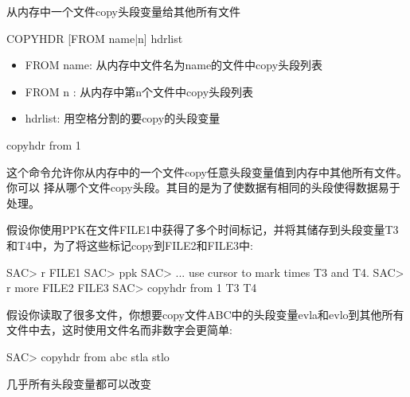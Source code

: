 \label{cmd:copyhdr}

从内存中一个文件copy头段变量给其他所有文件

\begin{SACSTX}
COPYHDR [FROM name|n] hdrlist
\end{SACSTX}

\begin{itemize}
\item FROM name: 从内存中文件名为name的文件中copy头段列表 
\item FROM n : 从内存中第n个文件中copy头段列表 
\item hdrlist: 用空格分割的要copy的头段变量 
\end{itemize}

\begin{SACDFT}
copyhdr from 1
\end{SACDFT}

这个命令允许你从内存中的一个文件copy任意头段变量值到内存中其他所有文件。你可以
择从哪个文件copy头段。其目的是为了使数据有相同的头段使得数据易于处理。

假设你使用PPK在文件FILE1中获得了多个时间标记，并将其储存到头段变量T3和T4中，为了将这些标记copy到FILE2和FILE3中:
\begin{SACCode}
SAC> r FILE1
SAC> ppk
SAC> ... use cursor to mark times T3 and T4.
SAC> r more FILE2 FILE3
SAC> copyhdr from 1 T3 T4
\end{SACCode}

假设你读取了很多文件，你想要copy文件ABC中的头段变量evla和evlo到其他所有文件中去，这时使用文件名而非数字会更简单:
\begin{SACCode}
SAC> copyhdr from abc stla stlo
\end{SACCode}

几乎所有头段变量都可以改变

